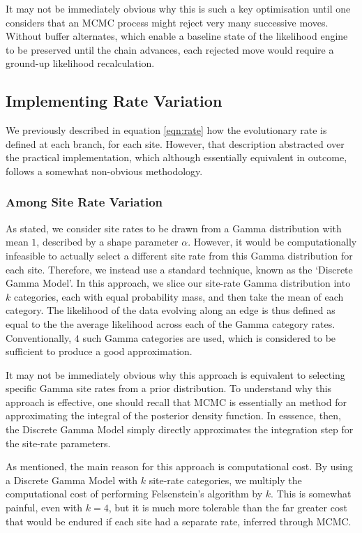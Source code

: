 \documentclass[10pt,journal,compsoc]{IEEEtran}
\begin{document}
It may not be immediately obvious why this is such a key optimisation until one considers that an MCMC process might reject very many successive moves. Without buffer alternates, which enable a baseline state of the likelihood engine to be preserved until the chain advances, each rejected move would require a ground-up likelihood recalculation.

\subsection{Implementing Rate Variation}

We previously described in equation \eqref{eqn:rate} how the evolutionary rate is defined at each branch, for each site. However, that description abstracted over the practical implementation, which although essentially equivalent in outcome, follows a somewhat non-obvious methodology.

\subsubsection{Among Site Rate Variation}

As stated, we consider site rates to be drawn from a Gamma distribution with mean $1$, described by a shape parameter $\alpha$. However, it would be computationally infeasible to actually select a different site rate from this Gamma distribution for each site. Therefore, we instead use a standard technique, known as the `Discrete Gamma Model'. In this approach, we slice our site-rate Gamma distribution into $k$ categories, each with equal probability mass, and then take the mean of each category. The likelihood of the data evolving along an edge is thus defined as equal to the the average likelihood across each of the Gamma category rates. Conventionally, $4$ such Gamma categories are used, which is considered to be sufficient to produce a good approximation.

It may not be immediately obvious why this approach is equivalent to selecting specific Gamma site rates from a prior distribution. To understand why this approach is effective, one should recall that MCMC is essentially an method for approximating the integral of the posterior density function. In esssence, then, the Discrete Gamma Model simply directly approximates the integration step for the site-rate parameters.

As mentioned, the main reason for this approach is computational cost. By using a Discrete Gamma Model with $k$ site-rate categories, we multiply the computational cost of performing Felsenstein's algorithm by $k$. This is somewhat painful, even with $k=4$, but it is much more tolerable than the far greater cost that would be endured if each site had a separate rate, inferred through MCMC.
\end{document}

